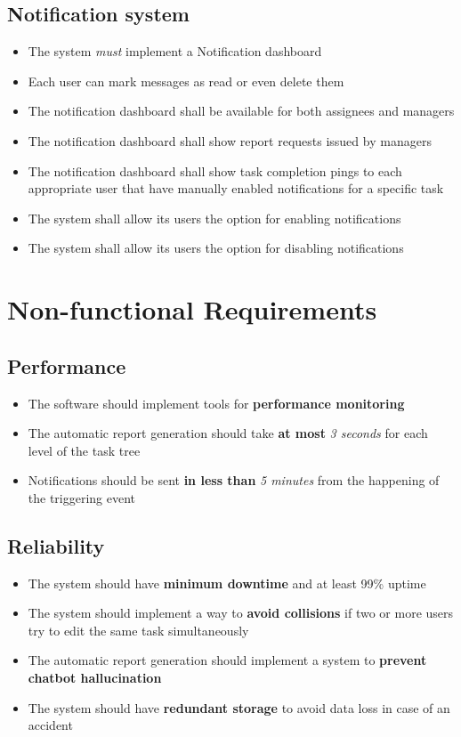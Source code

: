 \documentclass{article}
\begin{document}
\subsection{Notification system}
\begin{itemize}
    \item The system \textit{must} implement a Notification dashboard
    \item Each user can mark messages as read or even delete them
    \item The notification dashboard shall be available for both assignees and managers
    \item The notification dashboard shall show report requests issued by managers
    \item The notification dashboard shall show task completion pings to each appropriate user that have manually enabled notifications for a specific task
    \item The system shall allow its users the option for enabling notifications
    \item The system shall allow its users the option for disabling notifications
\end{itemize}

\section{Non-functional Requirements}
\subsection{Performance}
\begin{itemize}
    \item The software should implement tools for \textbf{performance monitoring}
    \item The automatic report generation should take \textbf{at most} \textit{3 seconds} for each level of the task tree
    \item Notifications should be sent \textbf{in less than} \textit{5 minutes} from the happening of the triggering event
\end{itemize}

\subsection{Reliability}
\begin{itemize}
    \item The system should have \textbf{minimum downtime} and at least 99\% uptime
    \item The system should implement a way to \textbf{avoid collisions} if two or more users try to edit the same task simultaneously
    \item The automatic report generation should implement a system to \textbf{prevent chatbot hallucination}
    \item The system should have \textbf{redundant storage} to avoid data loss in case of an accident
\end{itemize}
\end{document}

